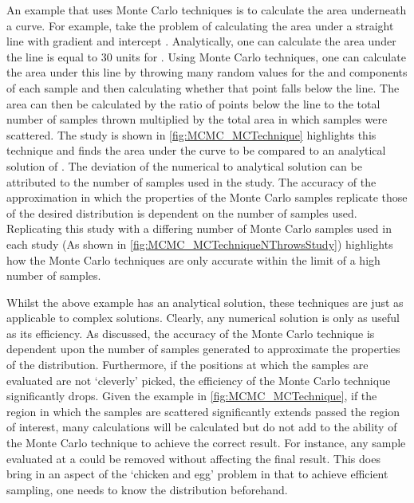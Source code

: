 An example that uses Monte Carlo techniques is to calculate the area underneath a curve. For example, take the problem of calculating the area under a straight line with gradient  and intercept . Analytically, one can calculate the area under the line is equal to 30 units for . Using Monte Carlo techniques, one can calculate the area under this line by throwing many random values for the  and  components of each sample and then calculating whether that point falls below the line. The area can then be calculated by the ratio of points below the line to the total number of samples thrown multiplied by the total area in which samples were scattered. The study is shown in \autoref{fig:MCMC_MCTechnique} highlights this technique and finds the area under the curve to be  compared to an analytical solution of . The deviation of the numerical to analytical solution can be attributed to the number of samples used in the study. The accuracy of the approximation in which the properties of the Monte Carlo samples replicate those of the desired distribution is dependent on the number of samples used. Replicating this study with a differing number of Monte Carlo samples used in each study (As shown in \autoref{fig:MCMC_MCTechniqueNThrowsStudy}) highlights how the Monte Carlo techniques are only accurate within the limit of a high number of samples.

Whilst the above example has an analytical solution, these techniques are just as applicable to complex solutions. Clearly,  any numerical solution is only as useful as its efficiency. As discussed, the accuracy of the Monte Carlo technique is dependent upon the number of samples generated to approximate the properties of the distribution. Furthermore, if the positions at which the samples are evaluated are not `cleverly' picked, the efficiency of the Monte Carlo technique significantly drops. Given the example in \autoref{fig:MCMC_MCTechnique}, if the region in which the samples are scattered significantly extends passed the region of interest, many calculations will be calculated but do not add to the ability of the Monte Carlo technique to achieve the correct result. For instance, any sample evaluated at a  could be removed without affecting the final result. This does bring in an aspect of the `chicken and egg' problem in that to achieve efficient sampling, one needs to know the distribution beforehand.

